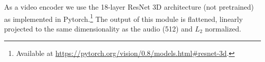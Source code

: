 As a video encoder we use the 18-layer ResNet 3D architecture
\citep{tran2018closer} (not pretrained) as implemented in
Pytorch.\footnote{Available at \url{https://pytorch.org/vision/0.8/models.html\#resnet-3d}.}  The output of this module is
flattened, linearly projected to the same dimensionality as the audio
(512) and $L_2$ normalized.
